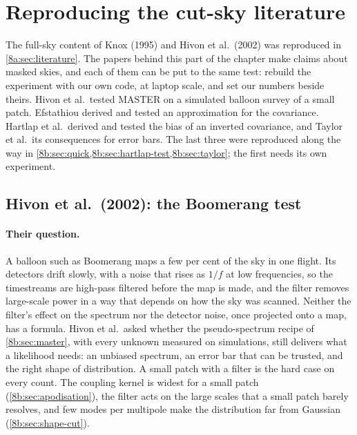 \section{Reproducing the cut-sky literature}
\label{8b:sec:literature}

The full-sky content of Knox (1995) and Hivon et al.\ (2002) was reproduced in
\cref{8a:sec:literature}. The papers behind this part of the chapter make claims about masked skies,
and each of them can be put to the same test: rebuild the experiment with our own code, at laptop scale,
and set our numbers beside theirs. Hivon et al.\ tested MASTER on a simulated balloon survey of a small
patch. Efstathiou derived and tested an approximation for the covariance. Hartlap et al.\ derived and
tested the bias of an inverted covariance, and Taylor et al.\ its consequences for error bars. The last
three were reproduced along the way in \cref{8b:sec:quick,8b:sec:hartlap-test,8b:sec:taylor}; the
first needs its own experiment.

\subsection{Hivon et al.\ (2002): the Boomerang test}
\label{8b:sec:lit-hivon}

\paragraph{Their question.}
A balloon such as Boomerang maps a few per cent of the sky in one flight. Its detectors drift slowly,
with a noise that rises as $1/f$ at low frequencies, so the timestreams are high-pass filtered before
the map is made, and the filter removes large-scale power in a way that depends on how the sky was
scanned. Neither the filter's effect on the spectrum nor the detector noise, once projected onto a
map, has a formula. Hivon et al.\ asked whether the pseudo-spectrum recipe of \cref{8b:sec:master},
with every unknown measured on simulations, still delivers what a likelihood needs: an unbiased
spectrum, an error bar that can be trusted, and the right shape of distribution. A small patch with a
filter is the hard case on every count. The coupling kernel is widest for a small patch
(\cref{8b:sec:apodisation}), the filter acts on the large scales that a small patch barely resolves,
and few modes per multipole make the distribution far from Gaussian (\cref{8b:sec:shape-cut}).


